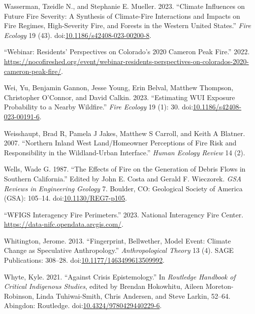 \documentclass[
]{article}
\newlength{\cslhangindent}
\newenvironment{CSLReferences}[2] %
 {\begin{list}{}{%
  \setlength{\itemindent}{0pt}
  \setlength{\leftmargin}{0pt}
  \setlength{\parsep}{0pt}
  \ifodd #1
   \setlength{\leftmargin}{\cslhangindent}
   \setlength{\itemindent}{-1\cslhangindent}
  \fi
  \setlength{\itemsep}{#2\baselineskip}}}
 {\end{list}}
\begin{document}
\begin{CSLReferences}{1}{0}
Wasserman, Tzeidle N., and Stephanie E. Mueller. 2023. {``Climate Influences on Future Fire Severity: A Synthesis of Climate-Fire Interactions and Impacts on Fire Regimes, High-Severity Fire, and Forests in the Western {United States}.''} \emph{Fire Ecology} 19 (43). doi:\href{https://doi.org/10.1186/s42408-023-00200-8}{10.1186/s42408-023-00200-8}.

{``Webinar: {Residents}' {Perspectives} on {Colorado}'s 2020 {Cameron Peak Fire}.''} 2022. \url{https://nocofireshed.org/event/webinar-residents-perspectives-on-colorados-2020-cameron-peak-fire/}.

Wei, Yu, Benjamin Gannon, Jesse Young, Erin Belval, Matthew Thompson, Christopher O'Connor, and David Calkin. 2023. {``Estimating {WUI} Exposure Probability to a Nearby Wildfire.''} \emph{Fire Ecology} 19 (1): 30. doi:\href{https://doi.org/10.1186/s42408-023-00191-6}{10.1186/s42408-023-00191-6}.

Weisshaupt, Brad R, Pamela J Jakes, Matthew S Carroll, and Keith A Blatner. 2007. {``Northern {Inland West Land}/{Homeowner Perceptions} of {Fire Risk} and {Responsibility} in the {Wildland-Urban Interface}.''} \emph{Human Ecology Review} 14 (2).

Wells, Wade G. 1987. {``The Effects of Fire on the Generation of Debris Flows in {Southern California}.''} Edited by John E. Costa and Gerald F. Wieczorek. \emph{GSA Reviews in Engineering Geology} 7. Boulder, CO: Geological Society of America (GSA): 105--14. doi:\href{https://doi.org/10.1130/REG7-p105}{10.1130/REG7-p105}.

{``{WFIGS Interagency Fire Perimeters}.''} 2023. National Interagency Fire Center. \url{https://data-nifc.opendata.arcgis.com/}.

Whitington, Jerome. 2013. {``Fingerprint, Bellwether, Model Event: {Climate} Change as Speculative Anthropology.''} \emph{Anthropological Theory} 13 (4). SAGE Publications: 308--28. doi:\href{https://doi.org/10.1177/1463499613509992}{10.1177/1463499613509992}.

Whyte, Kyle. 2021. {``Against Crisis Epistemology.''} In \emph{Routledge {Handbook} of {Critical Indigenous Studies}}, edited by Brendan Hokowhitu, Aileen Moreton-Robinson, Linda Tuhiwai-Smith, Chris Andersen, and Steve Larkin, 52--64. Abingdon: Routledge. doi:\href{https://doi.org/10.4324/9780429440229-6}{10.4324/9780429440229-6}.


\end{CSLReferences}
\end{document}
